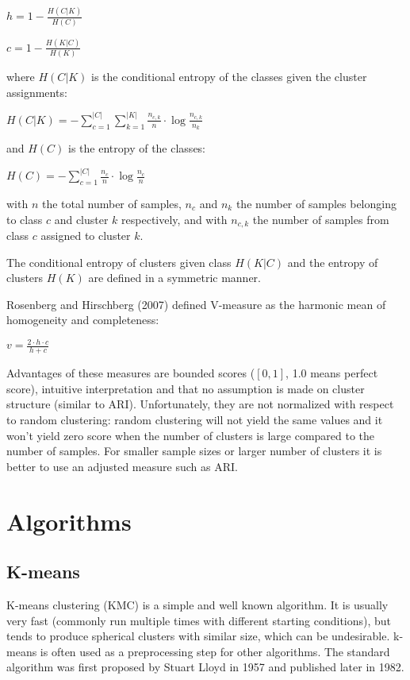 \documentclass[conference]{IEEEtran}
\begin{document}
$h = 1 - \frac{H(C|K)}{H(C)}$

$c = 1 - \frac{H(K|C)}{H(K)}$

where $H(C|K)$ is the conditional entropy of the classes given the cluster assignments:

$H(C|K) = - \sum\limits_{c=1}^{|C|}\sum\limits_{k=1}^{|K|}\frac{n_{c,k}}{n}\cdot \log{\frac{n_{c,k}}{n_k}}$

and $H(C)$ is the entropy of the classes:

$H(C) = - \sum\limits_{c=1}^{|C|}\frac{n_c}{n} \cdot \log{\frac{n_c}{n}}$

with $n$ the total number of samples, $n_c$ and $n_k$ the number of samples belonging to class
$c$ and cluster $k$ respectively, and with $n_{c,k}$ the number of samples from class $c$ assigned
to cluster $k$.

The conditional entropy of clusters given class $H(K|C)$ and the entropy of clusters $H(K)$ are
defined in a symmetric manner.

Rosenberg and Hirschberg (2007) defined V-measure as the harmonic mean of homogeneity and completeness:

$v = \frac{2 \cdot h \cdot c}{h+c}$

Advantages of these measures are bounded scores ($[0, 1]$, 1.0 means perfect score), intuitive interpretation and that
no assumption is made on cluster structure (similar to ARI). Unfortunately, they are not normalized
with respect to random clustering: random clustering will not yield the same values and it won't
yield zero score when the number of clusters is large compared to the number of samples. For smaller
sample sizes or larger number of clusters it is better to use an adjusted measure such as ARI.

\section{Algorithms}
\subsection{K-means}
K-means clustering (KMC) is a simple and well known algorithm. It is usually very
fast (commonly run multiple times with different starting conditions), but tends
to produce spherical clusters with similar size, which can be undesirable.
k-means is often used as a preprocessing step for other algorithms. The standard
algorithm was first proposed by Stuart Lloyd in 1957 and published later in 1982.
\end{document}
